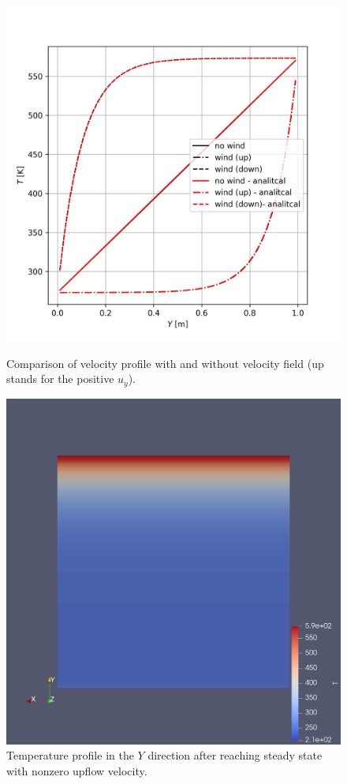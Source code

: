 \documentclass{article}
\begin{document}
\begin{figure}[!tbp]
    \centering
    \begin{minipage}[b]{0.45\textwidth}
        \includegraphics[width = \textwidth]{comp.png}
        \caption{Comparison of velocity profile with and without velocity field (up stands for the positive $u_y$).}\label{fig:com}
    \end{minipage}
    \hfill
    \begin{minipage}[b]{0.45\textwidth}
        \includegraphics[width = \textwidth]{mod_3d.png}
        \caption{Temperature profile in the $Y$ direction after reaching steady state with nonzero upflow velocity.}\label{fig:3d}
    \end{minipage}
\end{figure}
\end{document}

